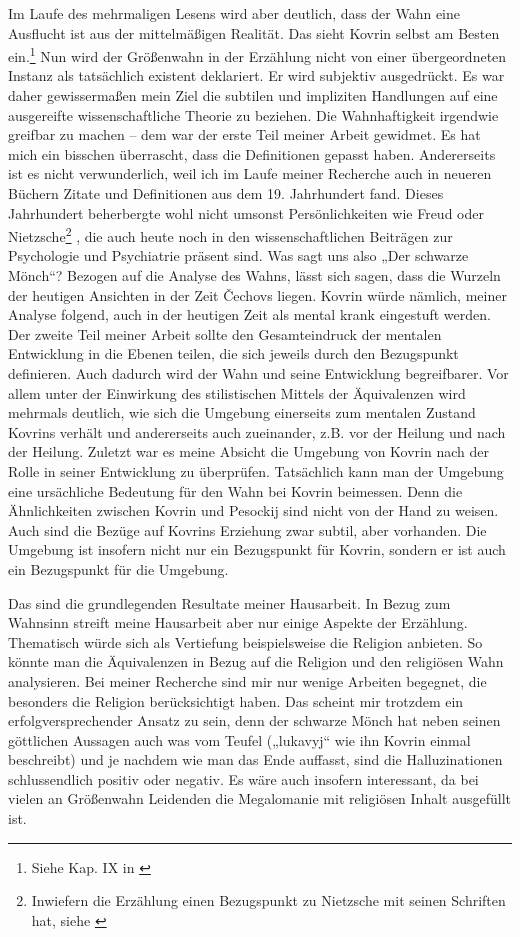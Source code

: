 \documentclass{../../sem_paper}
\begin{document}
Im Laufe des mehrmaligen Lesens wird aber deutlich, dass der Wahn eine Ausflucht ist aus der
mittelmäßigen Realität. Das sieht Kovrin selbst am Besten ein.\footnote{
Siehe Kap. IX in \autocite{blackmonk}} Nun wird der Größenwahn in der
Erzählung nicht von einer übergeordneten Instanz als tatsächlich existent deklariert. Er wird
subjektiv ausgedrückt. Es war daher gewissermaßen mein Ziel die subtilen und impliziten
Handlungen auf eine ausgereifte wissenschaftliche Theorie zu beziehen. Die Wahnhaftigkeit
irgendwie greifbar zu machen -- dem war der erste Teil meiner Arbeit gewidmet.
Es hat mich ein bisschen überrascht, dass die Definitionen gepasst haben. Andererseits ist es nicht
verwunderlich, weil ich im Laufe meiner Recherche auch in neueren Büchern Zitate und
Definitionen aus dem 19. Jahrhundert fand. Dieses Jahrhundert beherbergte wohl nicht
umsonst Persönlichkeiten wie Freud oder Nietzsche\footnote{
Inwiefern die Erzählung einen Bezugspunkt zu Nietzsche mit seinen Schriften hat, siehe \autocite{winner}
} , die auch heute noch in den
wissenschaftlichen Beiträgen zur Psychologie und Psychiatrie präsent sind.
Was sagt uns also „Der schwarze Mönch“? Bezogen auf die Analyse des Wahns, lässt sich sagen,
dass die Wurzeln der heutigen Ansichten in der Zeit Čechovs liegen. Kovrin würde nämlich, meiner
Analyse folgend, auch in der heutigen Zeit als mental krank eingestuft werden.
Der zweite Teil meiner Arbeit sollte den Gesamteindruck der mentalen Entwicklung in die Ebenen
teilen, die sich jeweils durch den Bezugspunkt definieren. Auch dadurch wird der Wahn und seine
Entwicklung begreifbarer. Vor allem unter der Einwirkung des stilistischen Mittels der
Äquivalenzen wird mehrmals deutlich, wie sich die Umgebung einerseits zum mentalen Zustand
Kovrins verhält und andererseits auch zueinander, z.B. vor der Heilung und nach der Heilung.
Zuletzt war es meine Absicht die Umgebung von Kovrin nach der Rolle in seiner Entwicklung zu
überprüfen. Tatsächlich kann man der Umgebung eine ursächliche Bedeutung für den Wahn bei
Kovrin beimessen. Denn die Ähnlichkeiten zwischen Kovrin und Pesockij sind nicht von der Hand
zu weisen. Auch sind die Bezüge auf Kovrins Erziehung zwar subtil, aber vorhanden. Die
Umgebung ist insofern nicht nur ein Bezugspunkt für Kovrin, sondern er ist auch ein Bezugspunkt
für die Umgebung.

Das sind die grundlegenden Resultate meiner Hausarbeit. In Bezug zum Wahnsinn streift meine
Hausarbeit aber nur einige Aspekte der Erzählung. Thematisch würde sich als Vertiefung
beispielsweise die Religion anbieten. So könnte man die Äquivalenzen in Bezug auf die Religion
und den religiösen Wahn analysieren. Bei meiner Recherche sind mir nur wenige Arbeiten
begegnet, die besonders die Religion berücksichtigt haben.\autocite{strelcova} Das scheint mir trotzdem ein
erfolgversprechender Ansatz zu sein, denn der schwarze Mönch hat neben seinen göttlichen
Aussagen auch was vom Teufel („lukavyj“ wie ihn Kovrin einmal beschreibt) und je nachdem wie
man das Ende auffasst, sind die Halluzinationen schlussendlich positiv oder negativ. Es wäre auch
insofern interessant, da bei vielen an Größenwahn Leidenden die Megalomanie mit religiösen Inhalt
ausgefüllt ist.

\literature
\end{document}
